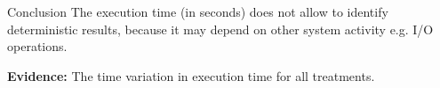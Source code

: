 \begin{frame}
\vspace*{2mm}
\begin{block}{
Conclusion
}
The execution time (in seconds) does not allow to identify deterministic results,
because it may depend on other system activity e.g. I/O operations.
 
{\bf Evidence:}
The time variation in execution time for all treatments.
\end{block}
\end{frame}